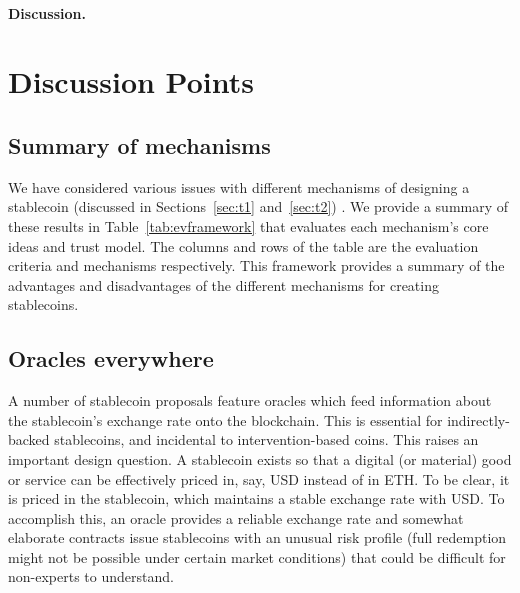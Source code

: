 \paragraph{Discussion.}



\section{Discussion Points}


\subsection{Summary of mechanisms}

We have considered various issues with different mechanisms of designing a stablecoin (discussed in Sections~\ref{sec:t1} and~\ref{sec:t2}) . We provide a summary of these results in  Table~\ref{tab:evframework} that evaluates each mechanism's core ideas and trust model. The columns and rows of the table are the evaluation criteria and mechanisms respectively. This framework provides a summary of the advantages and disadvantages of the different mechanisms for creating stablecoins.





\subsection{Oracles everywhere}

A number of stablecoin proposals feature oracles which feed information about the stablecoin's exchange rate onto the blockchain. This is essential for indirectly-backed stablecoins, and incidental to intervention-based coins. This raises an important design question. A stablecoin exists so that a digital (or material) good or service can be effectively priced in, say, USD instead of in ETH. To be clear, it is priced in the stablecoin, which maintains a stable exchange rate with USD. To accomplish this, an oracle provides a reliable exchange rate and somewhat elaborate contracts issue stablecoins with an unusual risk profile (\eg full redemption might not be possible under certain market conditions) that could be difficult for non-experts to understand.


